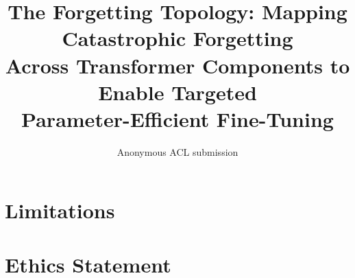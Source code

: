 \documentclass[11pt]{article}
\title{The Forgetting Topology: Mapping Catastrophic Forgetting\\
Across Transformer Components to Enable Targeted\\
Parameter-Efficient Fine-Tuning}
\author{Anonymous ACL submission}
\begin{document}
\maketitle

\begin{abstract}

\end{abstract}









\section*{Limitations}


\section*{Ethics Statement}




\appendix

\end{document}
